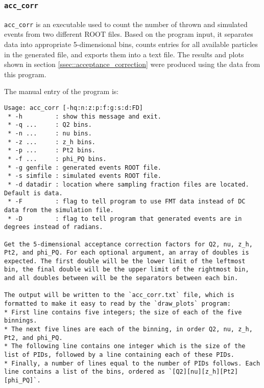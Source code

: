 \subsubsection{\texttt{acc\_corr}}
    \texttt{acc\_corr} is an executable used to count the number of thrown and simulated events from two different ROOT files.
    Based on the program input, it separates data into appropriate 5-dimensional bins, counts entries for all available particles in the generated file, and exports them into a text file.
    The results and plots shown in section \ref{ssec::acceptance_correction} were produced using the data from this program.

    The manual entry of the program is:
    \begin{lstlisting}
Usage: acc_corr [-hq:n:z:p:f:g:s:d:FD]
 * -h         : show this message and exit.
 * -q ...     : Q2 bins.
 * -n ...     : nu bins.
 * -z ...     : z_h bins.
 * -p ...     : Pt2 bins.
 * -f ...     : phi_PQ bins.
 * -g genfile : generated events ROOT file.
 * -s simfile : simulated events ROOT file.
 * -d datadir : location where sampling fraction files are located. Default is data.
 * -F         : flag to tell program to use FMT data instead of DC data from the simulation file.
 * -D         : flag to tell program that generated events are in degrees instead of radians.

Get the 5-dimensional acceptance correction factors for Q2, nu, z_h, Pt2, and phi_PQ. For each optional argument, an array of doubles is expected. The first double will be the lower limit of the leftmost bin, the final double will be the upper limit of the rightmost bin, and all doubles between will be the separators between each bin.

The output will be written to the `acc_corr.txt` file, which is formatted to make it easy to read by the `draw_plots` program:
* First line contains five integers; the size of each of the five binnings.
* The next five lines are each of the binning, in order Q2, nu, z_h, Pt2, and phi_PQ.
* The following line contains one integer which is the size of the list of PIDs, followed by a line containing each of these PIDs.
* Finally, a number of lines equal to the number of PIDs follows. Each line contains a list of the bins, ordered as `[Q2][nu][z_h][Pt2][phi_PQ]`.
    \end{lstlisting}
